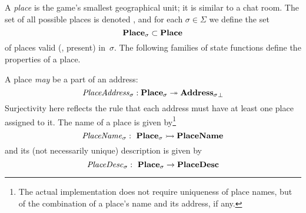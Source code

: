 A {\em place} is the game's smallest geographical unit; it is similar
to a chat room. The set of all possible places is denoted \placeset{},
and for each $\sigma \in \Sigma$ we define the set
\[ \textbf{Place}_{\sigma} \subset \textbf{Place}_{} \]
of places valid (\ie, present) in~$\sigma$.
The following families of
state functions define the properties of a place.

A place {\em may} be a part of an address:
\[ \mathit{PlaceAddress}_{\sigma}: \textbf{Place}_{\sigma} \twoheadrightarrow {\ensuremath{\textbf{Address}_{\sigma}}}_{\bot} \]
Surjectivity here reflects the rule that each address
must have at least one place assigned to it.
The name of a place is given by\footnote{The actual implementation
does not require uniqueness of place names, but of the combination of
a place's name and its address, if any.}
\[ \mathit{PlaceName}_{\sigma}:~ \textbf{Place}_{\sigma} \rightarrowtail \textbf{PlaceName}\]
and its (not necessarily unique) description is given by
\[ \mathit{PlaceDesc}_{\sigma}:~\textbf{Place}_{\sigma} \rightarrow \textbf{PlaceDesc} \]

